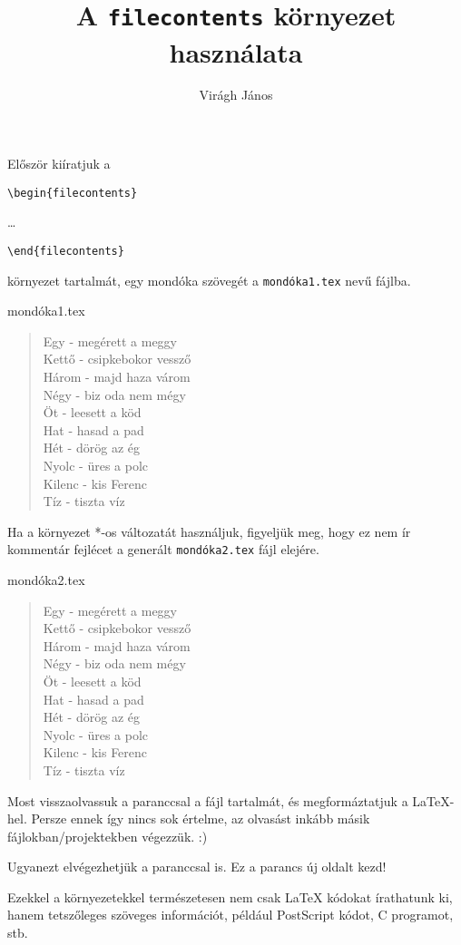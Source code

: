 \documentclass{article}
\title{A \texttt{filecontents} környezet használata}
\author{Virágh János}
\begin{document}
	
\maketitle

Először kiíratjuk a 

\verb!\begin{filecontents}!
	
\dots

\verb!\end{filecontents}!

környezet tartalmát, egy mondóka szövegét a \texttt{mondóka1.tex} nevű fájlba.

\begin{filecontents}{mondóka1.tex}
\begin{verse}
Egy - megérett a meggy\\
Kettő - csipkebokor vessző\\
Három - majd haza várom\\
Négy  - biz oda nem mégy\\
Öt - leesett a köd\\
Hat - hasad a pad\\
Hét - dörög az ég\\
Nyolc - üres a polc\\
Kilenc - kis Ferenc\\
Tíz - tiszta víz
\end{verse}
\end{filecontents}

\vspace*{1em}
Ha a környezet *-os változatát használjuk, figyeljük meg, hogy ez nem ír kommentár fejlécet a generált \texttt{mondóka2.tex} fájl elejére.

\begin{filecontents*}{mondóka2.tex}
\begin{verse}
Egy - megérett a meggy\\
Kettő - csipkebokor vessző\\
Három - majd haza várom\\
Négy  - biz oda nem mégy\\
Öt - leesett a köd\\
Hat - hasad a pad\\
Hét - dörög az ég\\
Nyolc - üres a polc\\
Kilenc - kis Ferenc\\
Tíz - tiszta víz
\end{verse}
\end{filecontents*}

\pagebreak[4]

Most visszaolvassuk  a \verb!! paranccsal a fájl tartalmát, és megformáztatjuk a \LaTeX-hel. Persze ennek így nincs sok értelme, az olvasást inkább másik fájlokban/projektekben végezzük. :)



Ugyanezt elvégezhetjük a  \verb!! paranccsal is. Ez a parancs új oldalt kezd!



Ezekkel a környezetekkel természetesen nem csak LaTeX kódokat írathatunk ki, hanem tetszőleges szöveges információt, például PostScript kódot, C programot, stb.
\end{document}
